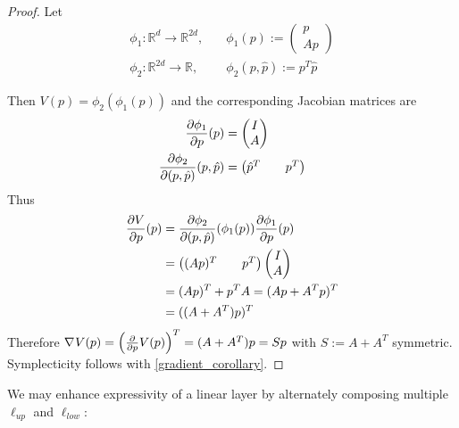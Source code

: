 \documentclass[twoside,a4paper]{article}
\begin{document}
\begin{proof}
	Let
	\begin{align*}
		\phi_1: \mathbb{R}^d \to \mathbb{R}^{2d}, \quad &\phi_1(p) := \begin{pmatrix}
			p \\
			Ap
		\end{pmatrix} \\
		\phi_2: \mathbb{R}^{2d} \to \mathbb{R}, \quad &\phi_2(p, \hat{p}) := 
		p^T\hat{p}
	\end{align*}
	
	Then $V(p) = \phi_2(\phi_1(p))$ and the corresponding Jacobian matrices are
	\begin{align*}
		\frac{\partial \phi_1}{\partial p}(p) &= \begin{pmatrix}
			I \\
			A
		\end{pmatrix} \\
		\frac{\partial \phi_2}{\partial (p,\hat{p})}(p, \hat{p}) &= \begin{pmatrix}
			\hat{p}^T && p^T
		\end{pmatrix}
	\end{align*}
	Thus
	\begin{align*}
		\frac{\partial V}{\partial p}(p) &= 
		\frac{\partial \phi_2}{\partial (p,\hat{p})} (\phi_1(p))
		\frac{\partial \phi_1}{\partial p}(p) \\
		&= \begin{pmatrix}
			(Ap)^T && p^T
		\end{pmatrix}
		\begin{pmatrix}
			I \\
			A
		\end{pmatrix} \\
		&= (Ap)^T + p^TA = (Ap + A^Tp)^T \\
		&= ((A+A^T)p)^T
	\end{align*}
	Therefore $\nabla_{}{V}(p) = \left( \frac{\partial }{\partial p}V(p) \right)^T = (A+A^T)p = Sp$ with
	$S := A+A^T$ symmetric. Symplecticity follows with \cref{gradient_corollary}.
\end{proof}

We may enhance expressivity of a linear layer by alternately composing multiple
$\ell_{up}$ and $\ell_{low}$:
\end{document}
